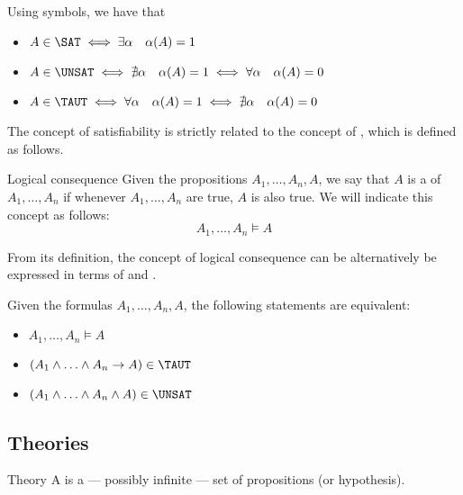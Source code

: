 \documentclass[a4paper, 12pt]{report}
\begin{document}
    Using symbols, we have that

    \begin{itemize}
        \item $A \in \SAT \iff \exists \alpha \quad \alpha (A) = 1$
        \item $A \in \UNSAT \iff \nexists \alpha \quad \alpha (A) = 1 \iff \forall \alpha \quad \alpha (A) = 0$
        \item $A \in \TAUT \iff \forall \alpha \quad \alpha(A) = 1 \iff \nexists \alpha \quad \alpha (A) = 0$
    \end{itemize}
    
    The concept of satisfiability is strictly related to the concept of , which is defined as follows.

    \begin{frameddefn}{Logical consequence}
        Given the propositions $A_1, \ldots, A_n, A$, we say that $A$ is a  of $A_1, \ldots, A_n$ if whenever $A_1, \ldots, A_n$ are true, $A$ is also true. We will indicate this concept as follows: $$A_1, \ldots, A_n \models A$$
    \end{frameddefn}

    From its definition, the concept of logical consequence can be alternatively be expressed in terms of  and .

    \begin{framedthm}{}
        Given the formulas $A_1, \ldots, A_n, A$, the following statements are equivalent:

        \begin{itemize}
            \item $A_1, \ldots, A_n \models A$
            \item $(A_1 \land \ldots \land A_n \rightarrow A) \in \TAUT$
            \item $(A_1 \land \ldots \land A_n \land A) \in \UNSAT$
        \end{itemize}
    \end{framedthm}

    \subsection{Theories}

    \begin{frameddefn}{Theory}
        A  is a --- possibly infinite --- set of propositions (or hypothesis).
    \end{frameddefn}
\end{document}

